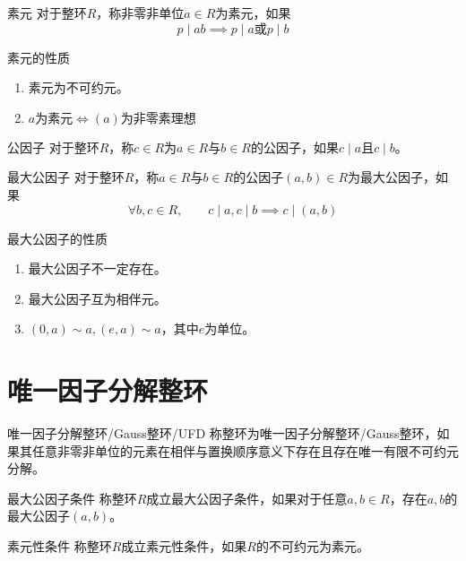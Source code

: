 \documentclass[lang = cn, scheme = chinese, thmcnt = section]{elegantbook}
\begin{document}
\begin{definition}{素元}
	对于整环$R$，称非零非单位$a\in R$为素元，如果
	$$
	p\mid ab\implies p\mid a\text{或}p\mid b
	$$
\end{definition}

\begin{proposition}{素元的性质}
	\begin{enumerate}
		\item 素元为不可约元。
		\item $a\text{为素元}\iff(a)\text{为非零素理想}$
	\end{enumerate}
\end{proposition}

\begin{definition}{公因子}
	对于整环$R$，称$c\in R$为$a\in R$与$b\in R$的公因子，如果$c\mid a$且$c\mid b$。
\end{definition}

\begin{definition}{最大公因子}
	对于整环$R$，称$a\in R$与$b\in R$的公因子$(a,b)\in R$为最大公因子，如果
	$$
	\forall b,c\in R,\qquad c\mid a,c\mid b\implies c\mid (a,b)
	$$
\end{definition}

\begin{proposition}{最大公因子的性质}
	\begin{enumerate}
		\item 最大公因子不一定存在。
		\item 最大公因子互为相伴元。
		\item $(0,a)\sim a,(e,a)\sim a$，其中$e$为单位。
	\end{enumerate}
\end{proposition}

\section{唯一因子分解整环}

\begin{definition}{唯一因子分解整环/Gauss整环/UFD}
	称整环为唯一因子分解整环/Gauss整环，如果其任意非零非单位的元素在相伴与置换顺序意义下存在且存在唯一有限不可约元分解。
\end{definition}

\begin{definition}{最大公因子条件}
	称整环$R$成立最大公因子条件，如果对于任意$a,b\in R$，存在$a,b$的最大公因子$(a,b)$。
\end{definition}

\begin{definition}{素元性条件}
	称整环$R$成立素元性条件，如果$R$的不可约元为素元。
\end{definition}
\end{document}
